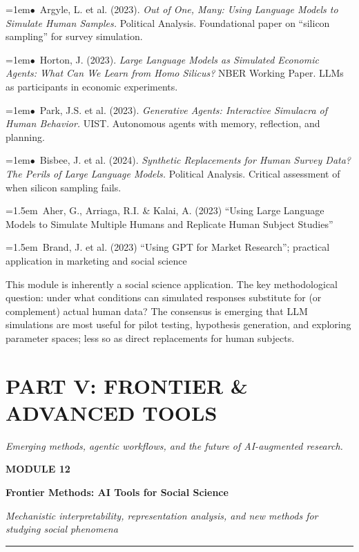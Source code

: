\documentclass[11pt, a4paper]{article}
\newcommand{\modulehead}[3]{%
  \vspace{0.5em}
  {\small\sffamily\bfseries\textcolor{accent}{MODULE #1}}\par\vspace{-0.3em}
  {\Large\sffamily\bfseries\textcolor{dark}{#2}}\par\vspace{-0.2em}
  {\small\textit{\textcolor{muted}{#3}}}\par
  \vspace{0.2em}\textcolor{bordercol}{\rule{\textwidth}{0.3pt}}\par
}
\newcommand{\seclabel}[1]{%
  \vspace{0.6em}{\normalsize\sffamily\bfseries\textcolor{accent}{#1}}\par\vspace{0.2em}
}
\newcommand{\refpaper}[1]{%
  \par\hangindent=1em\hangafter=1\noindent\textcolor{accent}{\small$\bullet$}~{\small #1}\par
}
\newcommand{\resource}[1]{%
  \par\hangindent=1.5em\hangafter=1\noindent\hspace{0.5em}{\small\textcolor{accent}{\guilsinglright}}~{\small #1}\par
}
\begin{document}
\refpaper{Argyle, L. et al. (2023). \textit{Out of One, Many: Using Language Models to Simulate Human Samples.} Political Analysis. Foundational paper on ``silicon sampling'' for survey simulation.}

\refpaper{Horton, J. (2023). \textit{Large Language Models as Simulated Economic Agents: What Can We Learn from Homo Silicus?} NBER Working Paper. LLMs as participants in economic experiments.}

\refpaper{Park, J.S. et al. (2023). \textit{Generative Agents: Interactive Simulacra of Human Behavior.} UIST. Autonomous agents with memory, reflection, and planning.}

\refpaper{Bisbee, J. et al. (2024). \textit{Synthetic Replacements for Human Survey Data? The Perils of Large Language Models.} Political Analysis. Critical assessment of when silicon sampling fails.}

\seclabel{Further Resources}

\resource{Aher, G., Arriaga, R.I. \& Kalai, A. (2023) ``Using Large Language Models to Simulate Multiple Humans and Replicate Human Subject Studies''}

\resource{Brand, J. et al. (2023) ``Using GPT for Market Research''; practical application in marketing and social science}

\begin{appblock}
This module is inherently a social science application. The key methodological question: under what conditions can simulated responses substitute for (or complement) actual human data? The consensus is emerging that LLM simulations are most useful for pilot testing, hypothesis generation, and exploring parameter spaces; less so as direct replacements for human subjects.
\end{appblock}


\newpage
\section{PART V: FRONTIER \& ADVANCED TOOLS}
{\textit{\textcolor{muted}{Emerging methods, agentic workflows, and the future of AI-augmented research.}}}

\vspace{1em}

\modulehead{12}{Frontier Methods: AI Tools for Social Science}{Mechanistic interpretability, representation analysis, and new methods for studying social phenomena}
\end{document}
